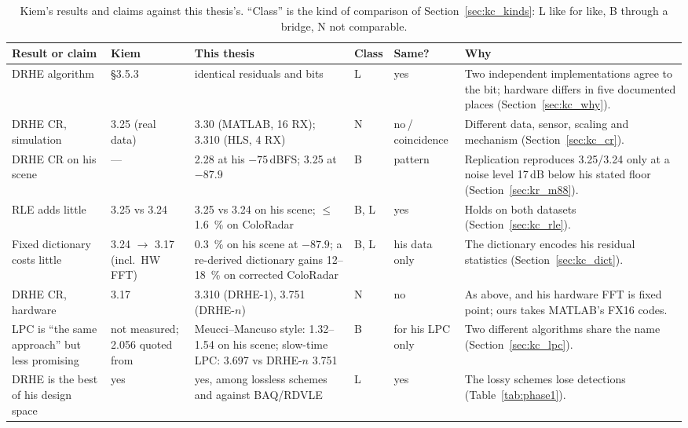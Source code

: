\begin{table}[p]
\centering
\caption[Kiem's results against this thesis's]{Kiem's results and claims
against this thesis's. ``Class'' is the kind of comparison of
Section~\ref{sec:kc_kinds}: L like for like, B through a bridge, N not
comparable.}
\label{tab:kc_all}
\scriptsize
\renewcommand{\arraystretch}{1.3}
\setlength{\tabcolsep}{3pt}
\begin{tabular}{@{}>{\raggedright}p{}>{\raggedright}p{}>{\raggedright}p{}>{\centering}p{}>{\centering}p{}>{\raggedright\arraybackslash}p{}@{}}
\toprule
Result or claim & Kiem & This thesis & Class & Same? & Why\\
\midrule
DRHE algorithm & \S{}3.5.3 & identical residuals and bits & L & yes & Two independent implementations agree to the bit; hardware differs in five documented places (Section~\ref{sec:kc_why}).\\
DRHE CR, simulation & 3.25 (real data) & 3.30 (MATLAB, 16 RX); 3.310 (HLS, 4 RX) & N & no\,/\,coincidence & Different data, sensor, scaling and mechanism (Section~\ref{sec:kc_cr}).\\
DRHE CR on his scene & --- & 2.28 at his $-75$\,dBFS; 3.25 at $-87.9$ & B & pattern & Replication reproduces 3.25/3.24 only at a noise level 17\,dB below his stated floor (Section~\ref{sec:kr_m88}).\\
RLE adds little & 3.25 vs 3.24 & 3.25 vs 3.24 on his scene; $\leq$\SI{1.6}{\percent} on ColoRadar & B, L & yes & Holds on both datasets (Section~\ref{sec:kc_rle}).\\
Fixed dictionary costs little & 3.24 $\to$ 3.17 (incl.\ HW FFT) & \SI{0.3}{\percent} on his scene at $-87.9$; a re-derived dictionary gains 12--\SI{18}{\percent} on corrected ColoRadar & B, L & his data only & The dictionary encodes his residual statistics (Section~\ref{sec:kc_dict}).\\
DRHE CR, hardware & 3.17 & 3.310 (DRHE-1), 3.751 (DRHE-$n$) & N & no & As above, and his hardware FFT is fixed point; ours takes MATLAB's FX16 codes.\\
LPC is ``the same approach'' but less promising & not measured; 2.056 quoted from \cite{meucci2022} & Meucci--Mancuso style: 1.32--1.54 on his scene; slow-time LPC: 3.697 vs DRHE-$n$ 3.751 & B & for his LPC only & Two different algorithms share the name (Section~\ref{sec:kc_lpc}).\\
DRHE is the best of his design space & yes & yes, among lossless schemes and against BAQ/RDVLE & L & yes & The lossy schemes lose detections (Table~\ref{tab:phase1}).\\

\end{tabular}
\end{table}
